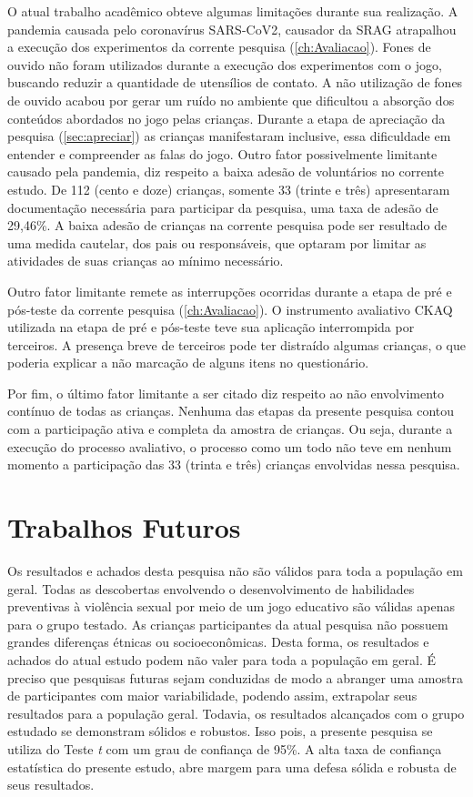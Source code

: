 O atual trabalho acadêmico obteve algumas limitações durante sua realização. A pandemia causada pelo coronavírus SARS-CoV2, causador da \ac{SRAG} atrapalhou a execução dos experimentos da corrente pesquisa (\autoref{ch:Avaliacao}). Fones de ouvido não foram utilizados durante a execução dos experimentos com o jogo, buscando reduzir a quantidade de utensílios de contato. A não utilização de fones de ouvido acabou por gerar um ruído no ambiente que dificultou a absorção dos conteúdos abordados no jogo pelas crianças. Durante a etapa de apreciação da pesquisa (\autoref{sec:apreciar}) as crianças manifestaram inclusive, essa dificuldade em entender e compreender as falas do jogo. Outro fator possivelmente limitante causado pela pandemia, diz respeito a baixa adesão de voluntários no corrente estudo. De 112 (cento e doze) crianças, somente 33 (trinte e três) apresentaram documentação necessária para participar da pesquisa, uma taxa de adesão de 29,46\%. A baixa adesão de crianças na corrente pesquisa pode ser resultado de uma medida cautelar, dos pais ou responsáveis, que optaram por limitar as atividades de suas crianças ao mínimo necessário. 

Outro fator limitante remete as interrupções ocorridas durante a etapa de pré e pós-teste da corrente pesquisa (\autoref{ch:Avaliacao}). O instrumento avaliativo \ac{CKAQ} utilizada na etapa de pré e pós-teste teve sua aplicação interrompida por terceiros. A presença breve de terceiros pode ter distraído algumas crianças, o que poderia explicar a não marcação de alguns itens no questionário. %

Por fim, o último fator limitante a ser citado diz respeito ao não envolvimento contínuo de todas as crianças. Nenhuma das etapas da presente pesquisa contou com a participação ativa e completa da amostra de crianças. Ou seja, durante a execução do processo avaliativo, o processo como um todo não teve em nenhum momento a participação das 33 (trinta e três) crianças envolvidas nessa pesquisa. 

\section{Trabalhos Futuros}\label{sec:futuros}

Os resultados e achados desta pesquisa não são válidos para toda a população em geral. Todas as descobertas envolvendo o desenvolvimento de habilidades preventivas à violência sexual por meio de um jogo educativo são válidas apenas para o grupo testado. As crianças participantes da atual pesquisa não possuem grandes diferenças étnicas ou socioeconômicas. Desta forma, os resultados e achados do atual estudo podem não valer para toda a população em geral. É preciso que pesquisas futuras sejam conduzidas de modo a abranger uma amostra de participantes com maior variabilidade, podendo assim, extrapolar seus resultados para a população geral. Todavia, os resultados alcançados com o grupo estudado se demonstram sólidos e robustos. Isso pois, a presente pesquisa se utiliza do Teste \textit{t} com um grau de confiança de 95\%. A alta taxa de confiança estatística do presente estudo, abre margem para uma defesa sólida e robusta de seus resultados.

